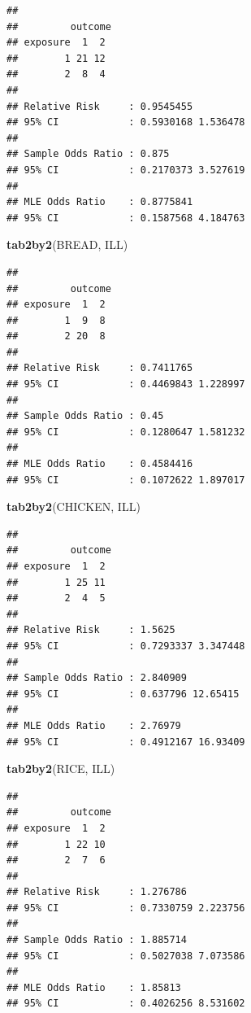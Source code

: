 \documentclass[12pt,a4paper]{book}
\newenvironment{Shaded}{\begin{snugshade}}{\end{snugshade}}
\newcommand{\KeywordTok}[1]{\textcolor[rgb]{0.13,0.29,0.53}{\textbf{#1}}}
\newcommand{\NormalTok}[1]{#1}
\theoremstyle{definition}
\theoremstyle{definition}
\theoremstyle{definition}
\theoremstyle{remark}
\begin{document}
\begin{verbatim}
## 
##         outcome
## exposure  1  2
##        1 21 12
##        2  8  4
## 
## Relative Risk     : 0.9545455 
## 95% CI            : 0.5930168 1.536478 
## 
## Sample Odds Ratio : 0.875 
## 95% CI            : 0.2170373 3.527619 
## 
## MLE Odds Ratio    : 0.8775841 
## 95% CI            : 0.1587568 4.184763
\end{verbatim}

\newpage

\begin{Shaded}
\begin{Highlighting}[]
\KeywordTok{tab2by2}\NormalTok{(BREAD, ILL)}
\end{Highlighting}
\end{Shaded}

\begin{verbatim}
## 
##         outcome
## exposure  1  2
##        1  9  8
##        2 20  8
## 
## Relative Risk     : 0.7411765 
## 95% CI            : 0.4469843 1.228997 
## 
## Sample Odds Ratio : 0.45 
## 95% CI            : 0.1280647 1.581232 
## 
## MLE Odds Ratio    : 0.4584416 
## 95% CI            : 0.1072622 1.897017
\end{verbatim}

\begin{Shaded}
\begin{Highlighting}[]
\KeywordTok{tab2by2}\NormalTok{(CHICKEN, ILL)}
\end{Highlighting}
\end{Shaded}

\begin{verbatim}
## 
##         outcome
## exposure  1  2
##        1 25 11
##        2  4  5
## 
## Relative Risk     : 1.5625 
## 95% CI            : 0.7293337 3.347448 
## 
## Sample Odds Ratio : 2.840909 
## 95% CI            : 0.637796 12.65415 
## 
## MLE Odds Ratio    : 2.76979 
## 95% CI            : 0.4912167 16.93409
\end{verbatim}

\newpage

\begin{Shaded}
\begin{Highlighting}[]
\KeywordTok{tab2by2}\NormalTok{(RICE, ILL)}
\end{Highlighting}
\end{Shaded}

\begin{verbatim}
## 
##         outcome
## exposure  1  2
##        1 22 10
##        2  7  6
## 
## Relative Risk     : 1.276786 
## 95% CI            : 0.7330759 2.223756 
## 
## Sample Odds Ratio : 1.885714 
## 95% CI            : 0.5027038 7.073586 
## 
## MLE Odds Ratio    : 1.85813 
## 95% CI            : 0.4026256 8.531602
\end{verbatim}
\end{document}
